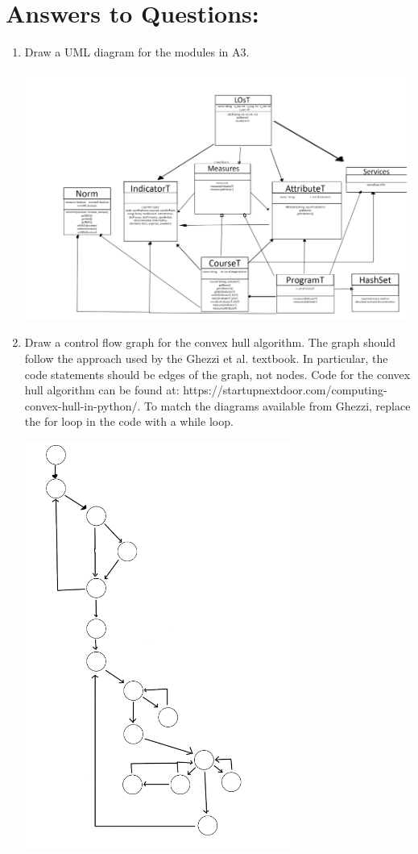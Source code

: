 \documentclass[12pt]{article}
\begin{document}
\newpage

\section*{Answers to Questions:}

\begin{enumerate}
  \item Draw a UML diagram for the modules in A3.
  \begin{center}
  \includegraphics[width=1\textwidth]{images/uml_a3.png}
  \end{center}
  \item Draw a control flow graph for the convex hull algorithm. The graph should follow the approach used by the Ghezzi et al. textbook. In particular, the code statements should be edges of the graph, not nodes. Code for the convex hull algorithm can be found at: https://startupnextdoor.com/computing-convex-hull-in-python/. To match the diagrams available from Ghezzi, replace the for loop in the code with a while loop.
  \begin{center}
  \includegraphics[width=0.7\textwidth]{images/control_flow.png}
  \end{center}
\end{enumerate}
\end{document}
